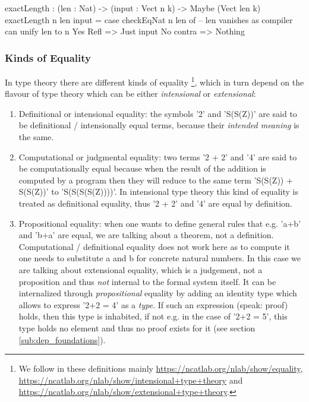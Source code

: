 \begin{HaskellCode}
exactLength : (len : Nat) -> (input : Vect n k) -> Maybe (Vect len k)
exactLength {n} len input = case checkEqNat n len of
                                 -- len vanishes as compiler can unify len to n
                                 Yes Refl  => Just input 
                                 No contra => Nothing
\end{HaskellCode} 

\subsubsection{Kinds of Equality}
In type theory there are different kinds of equality \footnote{We follow in these definitions mainly \url{https://ncatlab.org/nlab/show/equality}, \url{https://ncatlab.org/nlab/show/intensional+type+theory} and \url{https://ncatlab.org/nlab/show/extensional+type+theory}.}, which in turn depend on the flavour of type theory which can be either \textit{intensional} or \textit{extensional}:

\begin{enumerate}
	\item Definitional or intensional equality: the symbols '2' and 'S(S(Z))' are said to be definitional / intensionally equal terms, because their \textit{intended meaning} is the same.
	\item Computational or judgmental equality: two terms '2 + 2' and '4' are said to be computationally equal because when the result of the addition is computed by a program then they will reduce to the same term 'S(S(Z)) + S(S(Z))' to 'S(S(S(S(Z))))'. In intensional type theory this kind of equality is treated as definitional equality, thus '2 + 2' and '4' are equal by definition.
	\item Propositional equality: when one wants to define general rules that e.g. 'a+b' and 'b+a' are equal, we are talking about a theorem, not a definition. Computational / definitional equality does not work here as to compute it one needs to substitute a and b for concrete natural numbers. In this case we are talking about extensional equality, which is a judgement, not a proposition and thus \textit{not} internal to the formal system itself. It can be internalized through \textit{propositional} equality by adding an identity type which allows to express '2+2 = 4' as a \textit{type}. If such an expression (speak: proof) holds, then this type is inhabited, if not e.g. in the case of '2+2 = 5', this type holds no element and thus no proof exists for it (see section \ref{sub:dep_foundations}).
\end{enumerate}

